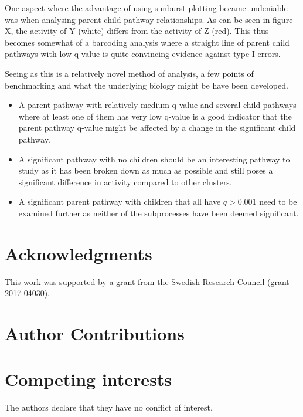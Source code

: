 \documentclass[11pt]{article}
\begin{document}
  One aspect where the advantage of using sunburst plotting became undeniable was when analysing parent child pathway relationships. As can be seen in figure X, the activity of Y (white) differs from the activity of Z (red). This thus becomes somewhat of a barcoding analysis where a straight line of parent child pathways with low q-value is quite convincing evidence against type I errors.

  Seeing as this is a relatively novel method of analysis, a few points of benchmarking and what the underlying biology might be have been developed.

  \begin{itemize}
      \item A parent pathway with relatively medium q-value and several child-pathways where at least one of them has very low q-value is a good indicator that the parent pathway q-value might be affected by a change in the significant child pathway.
      \item A significant pathway with no children should be an interesting pathway to study as it has been broken down as much as possible and still poses a significant difference in activity compared to other clusters.
      \item A significant parent pathway with children that all have $q > 0.001 $ need to be examined further as neither of the subprocesses have been deemed significant.
    \end{itemize}

\section*{Acknowledgments}

This work was supported by a grant from the Swedish Research Council (grant
2017-04030).

\section*{Author Contributions}

\section*{Competing interests}

The authors declare that they have no conflict of interest.

\printbibliography[title=References]
\end{document}
